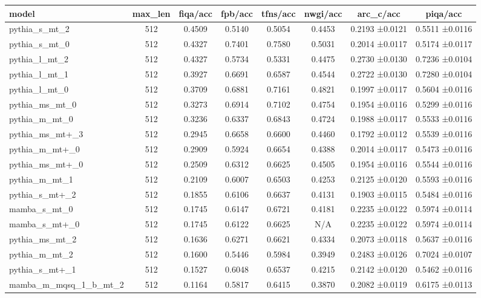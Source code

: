 \begin{tabular}{lccccccc}
\toprule
model & max\_len & fiqa/acc & fpb/acc & tfns/acc & nwgi/acc & arc\_c/acc & piqa/acc \\
\midrule
pythia\_s\_mt\_2 & 512 & 0.4509 & 0.5140 & 0.5054 & 0.4453 & 0.2193 ±0.0121 & 0.5511 ±0.0116 \\
pythia\_s\_mt\_0 & 512 & 0.4327 & 0.7401 & 0.7580 & 0.5031 & 0.2014 ±0.0117 & 0.5174 ±0.0117 \\
pythia\_l\_mt\_2 & 512 & 0.4327 & 0.5734 & 0.5331 & 0.4475 & 0.2730 ±0.0130 & 0.7236 ±0.0104 \\
pythia\_l\_mt\_1 & 512 & 0.3927 & 0.6691 & 0.6587 & 0.4544 & 0.2722 ±0.0130 & 0.7280 ±0.0104 \\
pythia\_l\_mt\_0 & 512 & 0.3709 & 0.6881 & 0.7161 & 0.4821 & 0.1997 ±0.0117 & 0.5604 ±0.0116 \\
pythia\_ms\_mt\_0 & 512 & 0.3273 & 0.6914 & 0.7102 & 0.4754 & 0.1954 ±0.0116 & 0.5299 ±0.0116 \\
pythia\_m\_mt\_0 & 512 & 0.3236 & 0.6337 & 0.6843 & 0.4724 & 0.1988 ±0.0117 & 0.5533 ±0.0116 \\
pythia\_ms\_mt+\_3 & 512 & 0.2945 & 0.6658 & 0.6600 & 0.4460 & 0.1792 ±0.0112 & 0.5539 ±0.0116 \\
pythia\_m\_mt+\_0 & 512 & 0.2909 & 0.5924 & 0.6654 & 0.4388 & 0.2014 ±0.0117 & 0.5473 ±0.0116 \\
pythia\_ms\_mt+\_0 & 512 & 0.2509 & 0.6312 & 0.6625 & 0.4505 & 0.1954 ±0.0116 & 0.5544 ±0.0116 \\
pythia\_m\_mt\_1 & 512 & 0.2109 & 0.6007 & 0.6503 & 0.4253 & 0.2125 ±0.0120 & 0.5593 ±0.0116 \\
pythia\_s\_mt+\_2 & 512 & 0.1855 & 0.6106 & 0.6637 & 0.4131 & 0.1903 ±0.0115 & 0.5484 ±0.0116 \\
mamba\_s\_mt\_0 & 512 & 0.1745 & 0.6147 & 0.6721 & 0.4181 & 0.2235 ±0.0122 & 0.5974 ±0.0114 \\
mamba\_s\_mt+\_0 & 512 & 0.1745 & 0.6122 & 0.6625 & N/A & 0.2235 ±0.0122 & 0.5974 ±0.0114 \\
pythia\_ms\_mt\_2 & 512 & 0.1636 & 0.6271 & 0.6621 & 0.4334 & 0.2073 ±0.0118 & 0.5637 ±0.0116 \\
pythia\_m\_mt\_2 & 512 & 0.1600 & 0.5446 & 0.5984 & 0.3949 & 0.2483 ±0.0126 & 0.7024 ±0.0107 \\
pythia\_s\_mt+\_1 & 512 & 0.1527 & 0.6048 & 0.6537 & 0.4215 & 0.2142 ±0.0120 & 0.5462 ±0.0116 \\
mamba\_m\_mqsq\_1\_b\_mt\_2 & 512 & 0.1164 & 0.5817 & 0.6415 & 0.3870 & 0.2082 ±0.0119 & 0.6175 ±0.0113 \\

\end{tabular}
